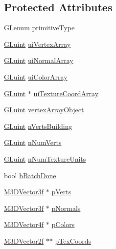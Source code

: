 \subsection*{Protected Attributes}
\begin{DoxyCompactItemize}
\item 
\hyperlink{_g_l_e_w_2glew_8h_a5d5233918a454ad3975c620a69ac5f0b}{G\-Lenum} \hyperlink{class_g_l_batch_a5eb087bfd959548e58d1f213ad9df3c4}{primitive\-Type}
\item 
\hyperlink{_g_l_e_w_2glew_8h_a68c4714e43d8e827d80759f9cb864f3c}{G\-Luint} \hyperlink{class_g_l_batch_a9b28fb6e5aefa2e523252dd85ffded3c}{ui\-Vertex\-Array}
\item 
\hyperlink{_g_l_e_w_2glew_8h_a68c4714e43d8e827d80759f9cb864f3c}{G\-Luint} \hyperlink{class_g_l_batch_ab6684b968df5b71a844d1e4ae5d32c81}{ui\-Normal\-Array}
\item 
\hyperlink{_g_l_e_w_2glew_8h_a68c4714e43d8e827d80759f9cb864f3c}{G\-Luint} \hyperlink{class_g_l_batch_ad22c19206d37e8a20156f515e1196992}{ui\-Color\-Array}
\item 
\hyperlink{_g_l_e_w_2glew_8h_a68c4714e43d8e827d80759f9cb864f3c}{G\-Luint} $\ast$ \hyperlink{class_g_l_batch_a5238f4fa96b4b26d3d037770b6e83966}{ui\-Texture\-Coord\-Array}
\item 
\hyperlink{_g_l_e_w_2glew_8h_a68c4714e43d8e827d80759f9cb864f3c}{G\-Luint} \hyperlink{class_g_l_batch_addb43b74e88b3e64728be8c16411fd9f}{vertex\-Array\-Object}
\item 
\hyperlink{_g_l_e_w_2glew_8h_a68c4714e43d8e827d80759f9cb864f3c}{G\-Luint} \hyperlink{class_g_l_batch_a896a080ed265b23b9d323a3983eb59ca}{n\-Verts\-Building}
\item 
\hyperlink{_g_l_e_w_2glew_8h_a68c4714e43d8e827d80759f9cb864f3c}{G\-Luint} \hyperlink{class_g_l_batch_ad418a5dc12c486c3f9ab66fcebff0110}{n\-Num\-Verts}
\item 
\hyperlink{_g_l_e_w_2glew_8h_a68c4714e43d8e827d80759f9cb864f3c}{G\-Luint} \hyperlink{class_g_l_batch_af07f7fd1e0b0e5590e2e1222e20117f2}{n\-Num\-Texture\-Units}
\item 
bool \hyperlink{class_g_l_batch_ada07f09c0670a29e3907d9abcff9b770}{b\-Batch\-Done}
\item 
\hyperlink{math3d_8h_a2163fe22bd4208b846d22ec7e74cf858}{M3\-D\-Vector3f} $\ast$ \hyperlink{class_g_l_batch_a06aac93af68f776ddc376e49564f843f}{p\-Verts}
\item 
\hyperlink{math3d_8h_a2163fe22bd4208b846d22ec7e74cf858}{M3\-D\-Vector3f} $\ast$ \hyperlink{class_g_l_batch_a13bfb9bca64332115893d15449c1f6e9}{p\-Normals}
\item 
\hyperlink{math3d_8h_a7da2e6b342ba064a875bf5bfc5dadb6f}{M3\-D\-Vector4f} $\ast$ \hyperlink{class_g_l_batch_a6e2262a2d27f4c856b17dcb123f73228}{p\-Colors}
\item 
\hyperlink{math3d_8h_a53c353d9bb3250cff53ebefe75cc8013}{M3\-D\-Vector2f} $\ast$$\ast$ \hyperlink{class_g_l_batch_a86d913248ec1fb610b62a36ae74751b2}{p\-Tex\-Coords}
\end{DoxyCompactItemize}


